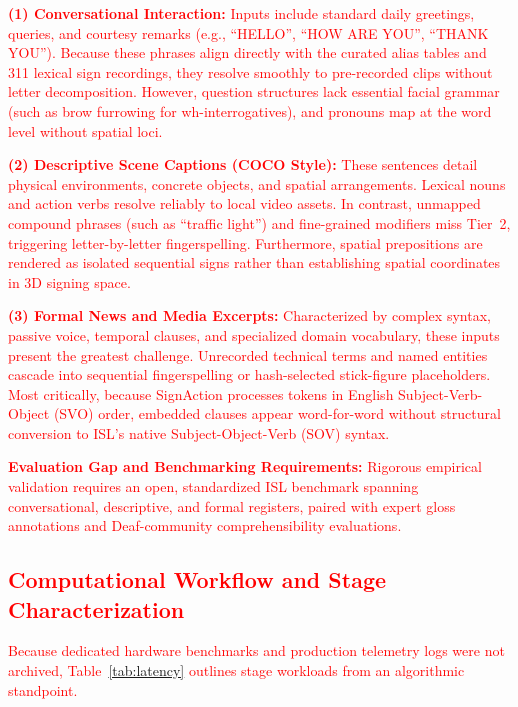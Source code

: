 \documentclass[conference,a4paper,10pt]{IEEEtran}
\begin{document}
\textcolor{red}{\textbf{(1) Conversational Interaction:} Inputs include standard daily greetings, queries, and courtesy remarks (e.g., ``HELLO'', ``HOW ARE YOU'', ``THANK YOU''). Because these phrases align directly with the curated alias tables and 311 lexical sign recordings, they resolve smoothly to pre-recorded clips without letter decomposition. However, question structures lack essential facial grammar (such as brow furrowing for wh-interrogatives), and pronouns map at the word level without spatial loci.}

\textcolor{red}{\textbf{(2) Descriptive Scene Captions (COCO Style):} These sentences detail physical environments, concrete objects, and spatial arrangements. Lexical nouns and action verbs resolve reliably to local video assets. In contrast, unmapped compound phrases (such as ``traffic light'') and fine-grained modifiers miss Tier~2, triggering letter-by-letter fingerspelling. Furthermore, spatial prepositions are rendered as isolated sequential signs rather than establishing spatial coordinates in 3D signing space.}

\textcolor{red}{\textbf{(3) Formal News and Media Excerpts:} Characterized by complex syntax, passive voice, temporal clauses, and specialized domain vocabulary, these inputs present the greatest challenge. Unrecorded technical terms and named entities cascade into sequential fingerspelling or hash-selected stick-figure placeholders. Most critically, because SignAction processes tokens in English Subject-Verb-Object (SVO) order, embedded clauses appear word-for-word without structural conversion to ISL's native Subject-Object-Verb (SOV) syntax.}

\textcolor{red}{\textbf{Evaluation Gap and Benchmarking Requirements:} Rigorous empirical validation requires an open, standardized ISL benchmark spanning conversational, descriptive, and formal registers, paired with expert gloss annotations and Deaf-community comprehensibility evaluations.}

\subsection{\textcolor{red}{Computational Workflow and Stage Characterization}}
\label{subsec:latency}

\textcolor{red}{Because dedicated hardware benchmarks and production telemetry logs were not archived, Table~\ref{tab:latency} outlines stage workloads from an algorithmic standpoint.}
\end{document}
